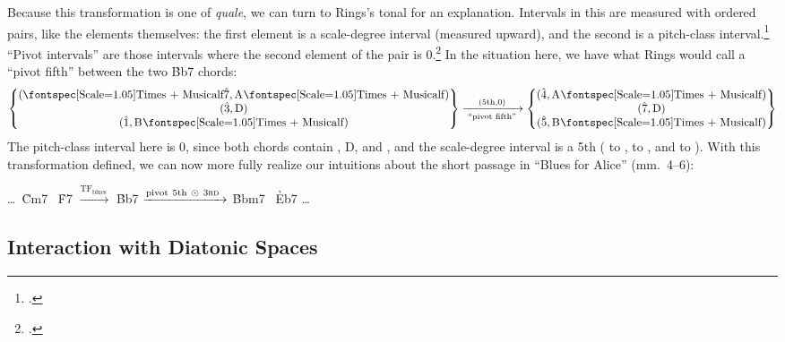 Because this transformation is one of \emph{quale}, we can turn to Rings's
tonal \gis for an explanation. Intervals in this \gis are measured with
ordered pairs, like the elements themselves: the first element is a
scale-degree interval (measured upward), and the second is a pitch-class
interval.\footcite[46--48]{rings:2011} ``Pivot intervals'' are those intervals
where the second element of the pair is $0$.\footcite[58--66]{rings:2011} In
the situation here, we have what Rings would call a ``pivot fifth'' between
the two \h{Bb7} chords:
%
\begin{displaymath}
  \setlength{\arraycolsep}{3em}
    \begin{Bmatrix}
      (\text{\flat\sd7}, \text{\Aflat}) \\
      (\text{\sd3},      \text{D}) \\
      (\text{\sd1},      \text{\Bflat})
    \end{Bmatrix}
    \xrightarrow[\text{ ``pivot fifth'' }]{(5\mathrm{th}, 0)}
    \begin{Bmatrix}
      (\text{\sd4}, \text{\Aflat}) \\
      (\text{\sd7}, \text{D}) \\
      (\text{\sd5}, \text{\Bflat})
    \end{Bmatrix}
\end{displaymath}
%
The pitch-class interval here is 0, since both chords contain \Bflat, D, and
\Aflat, and the scale-degree interval is a 5th ( to ,  to , and
\flat{} to ). With this transformation defined, we can now more fully
realize our intuitions about the short passage in ``Blues for Alice'' (mm.~4--6):
\begin{center}
  \ldots\ \h{Cm7} \TFarrow\ \h{F7} $\xrightarrow{\mathrm{TF}_{\mathrm{blues}}\ }$
  \h{Bb7} $\xrightarrow{\mathrm{ pivot\ 5th}\ \odot\ 3\text{\textsc{rd} }}$
  \h{Bbm7} \TFarrow\ \h{Eb7} \ldots
\end{center}


\subsection{Interaction with Diatonic Spaces}

